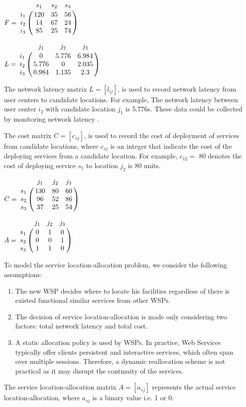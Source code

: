 \documentclass{llncs}
\let\bbordermatrix\bordermatrix
\begin{document}
\parbox{.45\linewidth}{
{\centering
$
F = \bbordermatrix{~ & s_{1} & s_{2} & s_{3}  \cr
					i_{1}	&120 &35 &56	\cr
					i_{2}	&14  &67 &24 \cr
					i_{3}	&85 &25 &74 \cr}
$
\\}
}
\parbox{.45\linewidth}{
{\centering
$
L = \bbordermatrix{~ & j_{1} & j_{2} & j_{3} \cr
					i_{1}	&0 &5.776 &6.984	\cr
					i_{2}	&5.776  &0 &2.035 \cr
					i_{3}	&0.984 &1.135	&2.3 \cr}
$
\\}
}

The network latency matrix $L = [l_{ij}]$, is used to record network latency from user centers to 
candidate locations. For example, The network latency between user center $i_{2}$ with candidate location $j_{1}$ 
is 5.776s. These data could be collected by monitoring network latency \cite{6076756} \cite{5552800}.

The cost matrix $C = [c_{sj}]$, is used to record the cost of deployment of services from candidate locations, 
where $c_{sj}$ is an integer that indicate the cost of the deploying services from a candidate location. 
For example, $c_{12} = $ 80 denotes the cost of deploying service $s_{1}$ to location $j_{2}$ is 80 units.

\parbox{.45\linewidth}{
{\centering
$
C = \bbordermatrix{~ & j_{1} & j_{2} & j_{3}\cr
					s_{1}	&130 &80 &60\cr
					s_{2}	&96  &52 &86\cr
					s_{3}	&37 &25 &54\cr}
$
\\}
}
\parbox{.45\linewidth}{
{\centering
$
A = \bbordermatrix{~ & j_{1} & j_{2} & j_{3}\cr
					s_{1}	&0 &1 &0	\cr
					s_{2}	&0  &0 &1	\cr
					s_{3}	&1 &1 &0	\cr}
$
\\}
}

To model the service location-allocation problem, we consider the following assumptions:
\begin{enumerate}
	\item The new WSP decides where to locate his facilities regardless of there is existed functional similar services from other WSPs.
	\item The decision of service location-allocation is made only considering two factors: total network latency and total cost.
	\item A static allocation policy is used by WSPs. In practice, Web Services typically offer clients persistent and interactive services, which often span over multiple sessions. Therefore, a dynamic reallocation scheme is not practical as it may disrupt the continuity of the services.
\end{enumerate}


The service location-allocation matrix $A = [a_{sj}]$ represents the actual service location-allocation, where $a_{sj}$  is a binary value i.e. 1 or 0.
\end{document}
